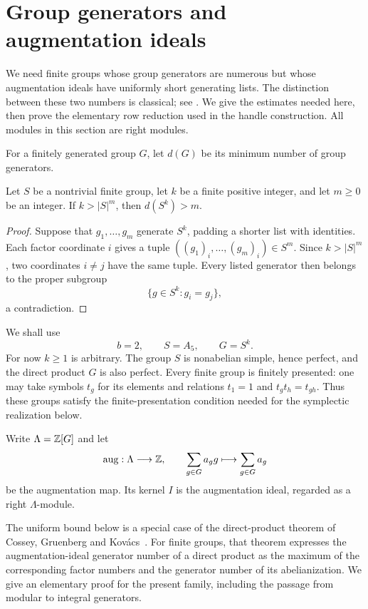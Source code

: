 \section{Group generators and augmentation ideals}
\label{sec:algebra}

We need finite groups whose group generators are numerous but whose
augmentation ideals have uniformly short generating lists.  The distinction
between these two numbers is classical; see
\cite[Sections~1--2]{GruenbergLinnell}.  We give the estimates needed here,
then prove the elementary row reduction used in the handle construction.
All modules in this section are right modules.

For a finitely generated group $G$, let $d(G)$ be its minimum number of
group generators.

\begin{lemma}\label{lem:group-gap}
Let $S$ be a nontrivial finite group, let $k$ be a finite positive
integer, and let $m\ge0$ be an integer.
If $k>|S|^m$, then $d(S^k)>m$.
\end{lemma}

\begin{proof}
Suppose that $g_1,\ldots,g_m$ generate $S^k$, padding a shorter list with
identities.  Each factor coordinate $i$ gives a tuple
$((g_1)_i,\ldots,(g_m)_i)\in S^m$.  Since $k>|S|^m$, two coordinates
$i\ne j$ have the same tuple.  Every listed generator then belongs to the
proper subgroup
\[
  \{g\in S^k:g_i=g_j\},
\]
a contradiction.
\end{proof}

We shall use
\begin{equation}\label{eq:group-choice}
  b=2,\qquad S=A_5,\qquad G=S^k.
\end{equation}
For now $k\ge1$ is arbitrary.  The group $S$ is nonabelian simple, hence
perfect, and the direct product $G$ is also perfect.  Every finite group is finitely presented: one may
take symbols $t_g$ for its elements and relations $t_1=1$ and
$t_gt_h=t_{gh}$.  Thus these groups satisfy the finite-presentation
condition needed for the symplectic realization below.

Write $\Lambda=\mathbb Z[G]$ and let
\[
  \operatorname{aug}:\Lambda\longrightarrow\mathbb Z,
  \qquad \sum_{g\in G}a_gg\longmapsto\sum_{g\in G}a_g
\]
be the augmentation map.  Its kernel $I$ is the augmentation ideal,
regarded as a right $\Lambda$-module.

The uniform bound below is a special case of the direct-product theorem
of Cossey, Gruenberg and Kov\'acs~\cite[Theorem~2]{CGK1974}.
For finite groups, that theorem expresses the augmentation-ideal
generator number of a direct product as the maximum of the corresponding
factor numbers and the generator number of its abelianization.
We give an elementary proof for the present family, including the
passage from modular to integral generators.

